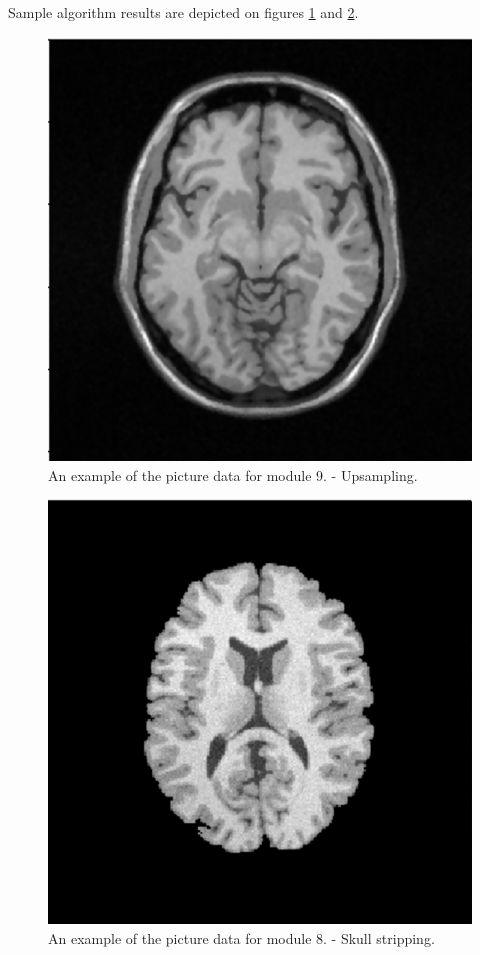Sample algorithm results are depicted on figures \ref{Fig:vis1} and \ref{Fig:vis2}.

\begin{figure}
\centering
\includegraphics[scale=0.65]{figures/vis1}

\caption[Threads scheme]{\label{Fig:vis1}An example of the picture data for module 9. - Upsampling.}
\end{figure}


\begin{figure}
\centering
\includegraphics[scale=0.65]{figures/vis2}

\caption[Threads scheme]{\label{Fig:vis2}An example of the picture data for module 8. - Skull stripping.}
\end{figure}



